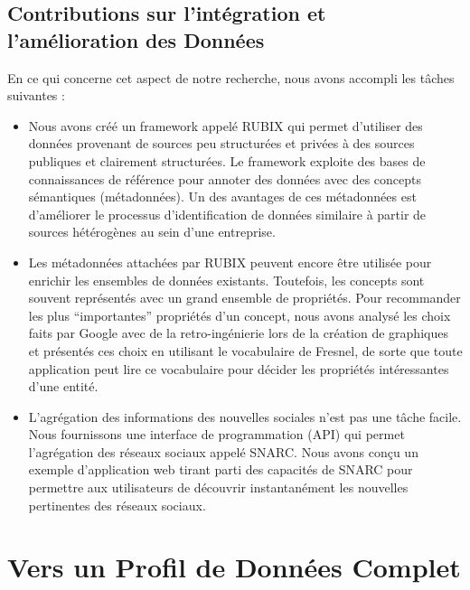 \subsection{Contributions sur l'int\'{e}gration et l'am\'{e}lioration des Donn\'{e}es}

En ce qui concerne cet aspect de notre recherche, nous avons accompli les tâches suivantes :
\begin{itemize}
\item Nous avons cr\'{e}\'{e} un framework appel\'{e} RUBIX qui permet d'utiliser des donn\'{e}es provenant de sources peu structur\'{e}es et priv\'{e}es à des sources publiques et clairement structur\'{e}es. Le framework exploite des bases de connaissances de r\'{e}f\'{e}rence pour annoter des donn\'{e}es avec des concepts s\'{e}mantiques (m\'{e}tadonn\'{e}es). Un des avantages de ces m\'{e}tadonn\'{e}es est d'am\'{e}liorer le processus d'identification de donn\'{e}es similaire à partir de sources h\'{e}t\'{e}rog\`{e}nes au sein d'une entreprise.
\item Les m\'{e}tadonn\'{e}es attach\'{e}es par RUBIX peuvent encore être utilis\'{e}e pour enrichir les ensembles de donn\'{e}es existants. Toutefois, les concepts sont souvent repr\'{e}sent\'{e}s avec un grand ensemble de propri\'{e}t\'{e}s. Pour recommander les plus ``importantes'' propri\'{e}t\'{e}s d'un concept, nous avons analys\'{e} les choix faits par Google avec de la retro-ing\'{e}nierie lors de la cr\'{e}ation de graphiques et pr\'{e}sent\'{e}s ces choix en utilisant le vocabulaire de Fresnel, de sorte que toute application peut lire ce vocabulaire pour d\'{e}cider les propri\'{e}t\'{e}s int\'{e}ressantes d'une entit\'{e}.
\item L'agr\'{e}gation des informations des nouvelles sociales n'est pas une tâche facile. Nous fournissons une interface de programmation (API) qui permet l'agr\'{e}gation des r\'{e}seaux sociaux appel\'{e} SNARC. Nous avons conçu un exemple d'application web tirant parti des capacit\'{e}s de SNARC pour permettre aux utilisateurs de d\'{e}couvrir instantan\'{e}ment les nouvelles pertinentes des r\'{e}seaux sociaux.
\end{itemize}

\let\cleardoublepage\clearpage\let\cleardoublepage\clearpage
\section{Vers un Profil de Donn\'{e}es Complet}

